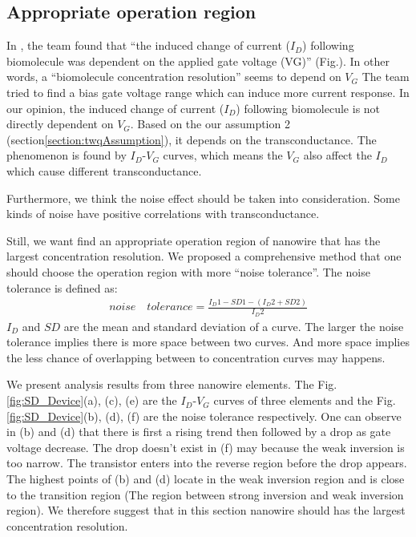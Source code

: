 \subsection*{Appropriate operation region} \label{section:biasVg}
In \cite{C6}, the team found that ``the induced change of current ($I_D$) following biomolecule was dependent on the applied gate voltage (VG)'' (Fig.).
In other words, a ``biomolecule concentration resolution'' seems to depend on $V_G$
The team tried to find a bias gate voltage range which can induce more current response.
In our opinion, the induced change of current ($I_D$) following biomolecule is not directly dependent on $V_G$.
Based on the our assumption 2 (section\ref{section:twqAssumption}), it depends on the transconductance.
The phenomenon is found by $I_D$-$V_G$ curves, which means the $V_G$ also affect the $I_D$ which cause different transconductance.

Furthermore, we think the noise effect should be taken into consideration.
Some kinds of noise have  positive correlations with transconductance.

Still, we want find an appropriate operation region of nanowire that has the largest concentration resolution.
We proposed a comprehensive method that one should choose the operation region with more ``noise tolerance''.
The noise tolerance is defined as:
\setlength{\mathindent}{2cm}
\begin{align}
    noise \quad tolerance = \frac{I_D1 - SD1 - (I_D2 + SD2)}{I_D2}
\end{align}
$I_D$ and $SD$ are the mean and standard deviation of a curve.
The larger the noise tolerance implies there is more space between two curves.
And more space implies the less chance of overlapping between to concentration curves may happens.

We present analysis results from three nanowire elements.
The Fig.\ref{fig:SD_Device}(a), (c), (e) are the $I_D$-$V_G$ curves of three elements and the Fig.\ref{fig:SD_Device}(b), (d), (f) are the noise tolerance respectively.
One can observe in (b) and (d) that there is first a rising trend then followed by a drop as gate voltage decrease.
The drop doesn't exist in (f) may because the weak inversion is too narrow.
The transistor enters into the reverse region before the drop appears.
The highest points of (b) and (d) locate in the weak inversion region and is close to the transition region (The region between strong inversion and weak inversion region).
We therefore suggest that in this section nanowire should has the largest concentration resolution.



